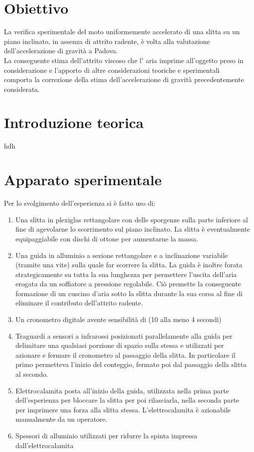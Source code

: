 \documentclass[a4paper,11pt,oneside]{article}
\begin{document}

\section{Obiettivo}
La verifica sperimentale del moto uniformemente accelerato di una slitta su un piano inclinato, in assenza di attrito radente, è volta alla valutazione dell'accelerazione  di gravità a Padova.\\
La conseguente stima dell'attrito viscoso che l' aria imprime all'oggetto preso in considerazione e l'apporto di altre considerazioni teoriche e sperimentali comporta la correzione della stima dell’accelerazione di gravità precedentemente considerata.

\section{Introduzione teorica}
hdh
\section{Apparato sperimentale}\label{section:apparato}
Per lo svolgimento dell'esperienza si è fatto uso di:
\begin{enumerate}
    \item Una slitta in plexiglas rettangolare con delle sporgenze sulla parte inferiore al fine di agevolarne lo scorrimento sul piano inclinato. La slitta è eventualmente equipaggiabile con dischi di ottone per aumentarne la massa.
    \item Una guida in alluminio a sezione rettangolare e a inclinazione variabile (tramite una vite) sulla quale far scorrere la slitta. La guida è inoltre forata strategicamente su tutta la sua lunghezza per permettere l'uscita dell'aria erogata da un soffiatore a pressione regolabile. Ciò premette la conseguente formazione di un cuscino d'aria sotto la slitta durante la sua corsa al fine di eliminare il contributo dell'attrito radente.
    \item Un cronometro digitale avente sensibilità di (10 alla meno 4 secondi)
    \item Traguardi a sensori a infrarossi posizionati parallelamente alla guida per delimitare una qualsiasi porzione di spazio sulla stessa e  utilizzati per azionare e fermare il cronometro al passaggio della slitta. In particolare il primo permetteva l'inizio del conteggio, fermato poi dal passaggio della slitta al secondo.
    \item Elettrocalamita posta all'inizio della guida, utilizzata nella prima parte dell'esperienza per bloccare la slitta per poi rilasciarla, nella seconda parte  per imprimere una forza  alla slitta stessa. L'elettrocalamita è azionabile manualmente da un operatore.
    \item Spessori di alluminio utilizzati per ridurre la spinta impressa dall'elettrocalamita
\end{enumerate}
    
\end{document}
